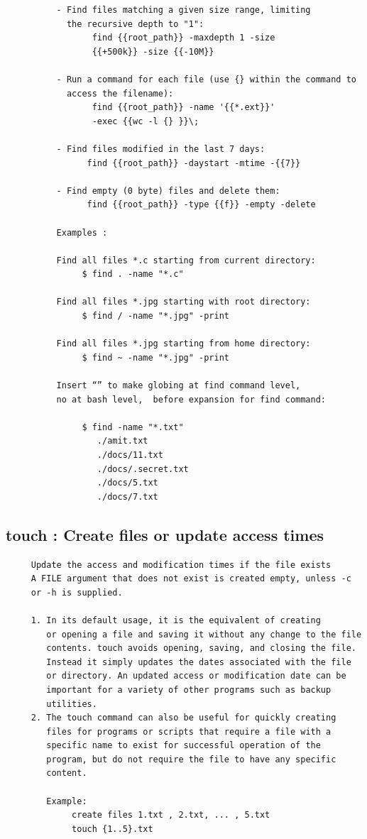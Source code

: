 \documentclass[a4paper,12pt]{article}
\begin{document}
\begin{verbatim}
          - Find files matching a given size range, limiting
            the recursive depth to "1":
                 find {{root_path}} -maxdepth 1 -size
                 {{+500k}} -size {{-10M}}

          - Run a command for each file (use {} within the command to          
            access the filename):
                 find {{root_path}} -name '{{*.ext}}' 
                 -exec {{wc -l {} }}\;

          - Find files modified in the last 7 days:
                find {{root_path}} -daystart -mtime -{{7}}

          - Find empty (0 byte) files and delete them:
                find {{root_path}} -type {{f}} -empty -delete

          Examples : 

          Find all files *.c starting from current directory:
               $ find . -name "*.c"

          Find all files *.jpg starting with root directory: 
               $ find / -name "*.jpg" -print
                           
          Find all files *.jpg starting from home directory:   
               $ find ~ -name "*.jpg" -print

          Insert “” to make globing at find command level, 
          no at bash level,  before expansion for find command:

               $ find -name "*.txt"
                  ./amit.txt
                  ./docs/11.txt
                  ./docs/.secret.txt
                  ./docs/5.txt
                  ./docs/7.txt

\end{verbatim}




\subsection{touch    : Create files or update access times}
\begin{verbatim}
     Update the access and modification times if the file exists
     A FILE argument that does not exist is created empty, unless -c   
     or -h is supplied.      
     
     1. In its default usage, it is the equivalent of creating
        or opening a file and saving it without any change to the file  
        contents. touch avoids opening, saving, and closing the file.  
        Instead it simply updates the dates associated with the file 
        or directory. An updated access or modification date can be 
        important for a variety of other programs such as backup 
        utilities.
     2. The touch command can also be useful for quickly creating 
        files for programs or scripts that require a file with a 
        specific name to exist for successful operation of the 
        program, but do not require the file to have any specific          
        content.
        
		Example:
		     create files 1.txt , 2.txt, ... , 5.txt
		     touch {1..5}.txt
		           
        
\end{verbatim}
\end{document}
